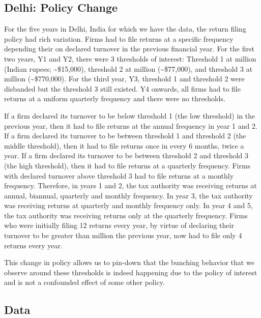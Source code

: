 \subsection{Delhi: Policy Change}
\label{subsec:3-background}
For the five years in Delhi, India for which we have the data, the return filing policy had rich variation. Firms had to file returns at a specific frequency depending their on declared turnover in the previous financial year. For the first two years, Y1 and Y2, there were 3 thresholds of interest: Threshold 1 at  million  (Indian rupees; \textasciitilde{}\$15,000), threshold 2 at  million  (\textasciitilde{}\$77,000), and threshold 3 at  million  (\textasciitilde{}\$770,000). For the third year, Y3, threshold 1 and threshold 2 were disbanded but the threshold 3 still existed. Y4 onwards, all firms had to file returns at a uniform quarterly frequency and there were no thresholds. 

If a firm declared its turnover to be below threshold 1 (the low threshold) in the previous year, then it had to file returns at the annual frequency in year 1 and 2. If a firm declared its turnover to be between threshold 1 and threshold 2 (the middle threshold), then it had to file returns once in every 6 months, twice a year. If a firm declared its turnover to be between threshold 2 and threshold 3 (the high threshold), then it had to file returns at a quarterly frequency. Firms with declared turnover above threshold 3 had to file returns at a monthly frequency. Therefore, in years 1 and 2, the tax authority was receiving returns at annual, biannual, quarterly and monthly frequency. In year 3, the tax authority was receiving returns at quarterly and monthly frequency only. In year 4 and 5, the tax authority was receiving returns only at the quarterly frequency. Firms who were initially filing 12 returns every year, by virtue of declaring their turnover to be greater than  million the previous year, now had to file only 4 returns every year. 

This change in policy allows us to pin-down that the bunching behavior that we observe around these thresholds is indeed happening due to the policy of interest and is not a confounded effect of some other policy. 

\subsection{Data}
\label{subsec:3-data}


